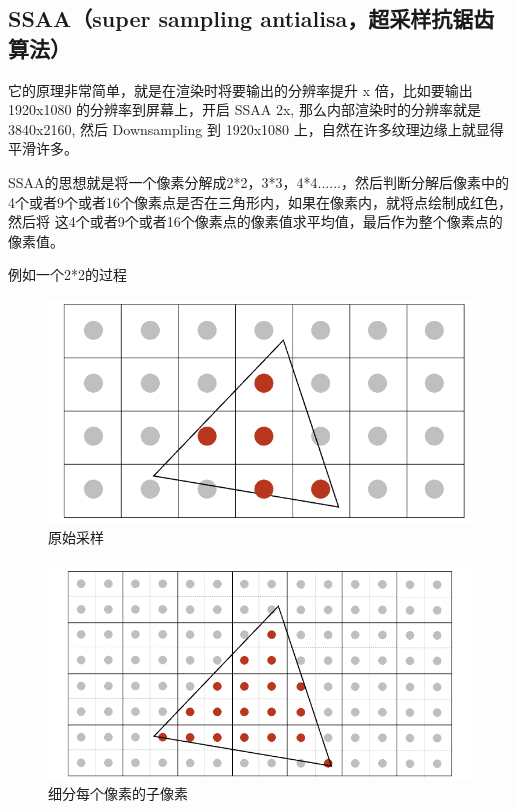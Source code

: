 \subsection*{SSAA（super sampling antialisa，超采样抗锯齿算法）}

它的原理非常简单，就是在渲染时将要输出的分辨率提升 x 倍，比如要输出 1920x1080 的分辨率到屏幕上，开启 SSAA 2x, 那么内部渲染时的分辨率就是 3840x2160, 然后 Downsampling 到 1920x1080 上，自然在许多纹理边缘上就显得平滑许多。

SSAA的思想就是将一个像素分解成2*2，3*3，4*4......，然后判断分解后像素中的4个或者9个或者16个像素点是否在三角形内，如果在像素内，就将点绘制成红色，然后将
这4个或者9个或者16个像素点的像素值求平均值，最后作为整个像素点的像素值。

例如一个2*2的过程

\begin{figure}[H]
    \centering
    \includegraphics[scale=0.3]{figures/SSAA1.png}
    \caption{原始采样}
\end{figure}

\begin{figure}[H]
    \centering
    \includegraphics[scale=0.3]{figures/SSAA2.png}
    \caption{细分每个像素的子像素}
\end{figure}

